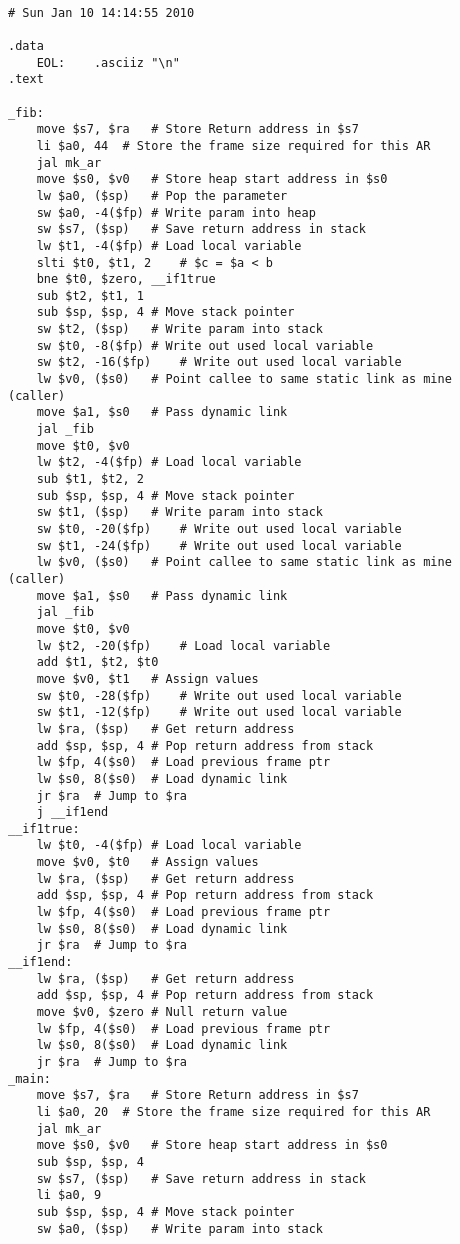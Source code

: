 \begin{lstlisting}[showstringspaces=false,breaklines=true,backgroundcolor=\color{light-gray}, captionpos=b]
         
# Sun Jan 10 14:14:55 2010

.data
	EOL:	.asciiz "\n"
.text

_fib:
	move $s7, $ra	# Store Return address in $s7
	li $a0, 44	# Store the frame size required for this AR
	jal mk_ar
	move $s0, $v0	# Store heap start address in $s0
	lw $a0, ($sp)	# Pop the parameter
	sw $a0, -4($fp)	# Write param into heap
	sw $s7, ($sp)	# Save return address in stack
	lw $t1, -4($fp)	# Load local variable
	slti $t0, $t1, 2	# $c = $a < b
	bne $t0, $zero, __if1true
	sub $t2, $t1, 1
	sub $sp, $sp, 4	# Move stack pointer
	sw $t2, ($sp)	# Write param into stack
	sw $t0, -8($fp)	# Write out used local variable
	sw $t2, -16($fp)	# Write out used local variable
	lw $v0, ($s0)	# Point callee to same static link as mine (caller)
	move $a1, $s0	# Pass dynamic link
	jal _fib
	move $t0, $v0
	lw $t2, -4($fp)	# Load local variable
	sub $t1, $t2, 2
	sub $sp, $sp, 4	# Move stack pointer
	sw $t1, ($sp)	# Write param into stack
	sw $t0, -20($fp)	# Write out used local variable
	sw $t1, -24($fp)	# Write out used local variable
	lw $v0, ($s0)	# Point callee to same static link as mine (caller)
	move $a1, $s0	# Pass dynamic link
	jal _fib
	move $t0, $v0
	lw $t2, -20($fp)	# Load local variable
	add $t1, $t2, $t0
	move $v0, $t1	# Assign values
	sw $t0, -28($fp)	# Write out used local variable
	sw $t1, -12($fp)	# Write out used local variable
	lw $ra, ($sp)	# Get return address
	add $sp, $sp, 4	# Pop return address from stack
	lw $fp, 4($s0)	# Load previous frame ptr
	lw $s0, 8($s0)	# Load dynamic link
	jr $ra	# Jump to $ra
	j __if1end
__if1true:
	lw $t0, -4($fp)	# Load local variable
	move $v0, $t0	# Assign values
	lw $ra, ($sp)	# Get return address
	add $sp, $sp, 4	# Pop return address from stack
	lw $fp, 4($s0)	# Load previous frame ptr
	lw $s0, 8($s0)	# Load dynamic link
	jr $ra	# Jump to $ra
__if1end:
	lw $ra, ($sp)	# Get return address
	add $sp, $sp, 4	# Pop return address from stack
	move $v0, $zero	# Null return value
	lw $fp, 4($s0)	# Load previous frame ptr
	lw $s0, 8($s0)	# Load dynamic link
	jr $ra	# Jump to $ra
_main:
	move $s7, $ra	# Store Return address in $s7
	li $a0, 20	# Store the frame size required for this AR
	jal mk_ar
	move $s0, $v0	# Store heap start address in $s0
	sub $sp, $sp, 4
	sw $s7, ($sp)	# Save return address in stack
	li $a0, 9
	sub $sp, $sp, 4	# Move stack pointer
	sw $a0, ($sp)	# Write param into stack

\end{lstlisting}
